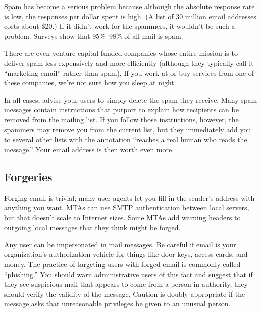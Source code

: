 Spam has become a serious problem because although the absolute response
rate is low, the responses per dollar spent is high. (A list of 30
million email addresses costs about \$20.) If it didn't work for the
spammers, it wouldn't be such a problem. Surveys show that 95\%--98\% of
all mail is spam.

There are even venture-capital-funded companies whose entire mission is
to deliver spam less expensively and more efficiently (although they
typically call it ``marketing email'' rather than spam). If you work at
or buy services from one of these companies, we're not sure how you
sleep at night.

In all cases, advise your users to simply delete the spam they receive.
Many spam messages contain instructions that purport to explain how
recipients can be removed from the mailing list. If you follow those
instructions, however, the spammers may remove you from the current
list, but they immediately add you to several other lists with the
annotation ``reaches a real human who reads the message.'' Your email
address is then worth even more.

\protect\hypertarget{part0026_split_014.html}{}{}

\hypertarget{part0026_split_014.htmlux5cux23_idContainer1247}{}
\hypertarget{part0026_split_014.htmlux5cux23calibre_pb_13}{%
\subsection[Forgeries]{\texorpdfstring{\protect\hypertarget{part0026_split_014.htmlux5cux23_idTextAnchor1021}{}{}Forgeries}{Forgeries}}\label{part0026_split_014.htmlux5cux23calibre_pb_13}}

\protect\hypertarget{part0026_split_014.htmlux5cux23_idIndexMarker2447}{}{}Forging
email is trivial; many user agents let you fill in the sender's address
with anything you want. MTAs can use SMTP authentication between local
servers, but that doesn't scale to Internet sizes. Some MTAs add warning
headers to outgoing local messages that they think might be forged.

Any user can be impersonated in mail messages. Be careful if email is
your organization's authorization vehicle for things like door keys,
access cards, and money. The practice of targeting users with forged
email is commonly called ``phishing.'' You should warn administrative
users of this fact and suggest that if they see suspicious mail that
appears to come from a person in authority, they should verify the
validity of the message. Caution is doubly appropriate if the message
asks that unreasonable privileges be given to an unusual person.

